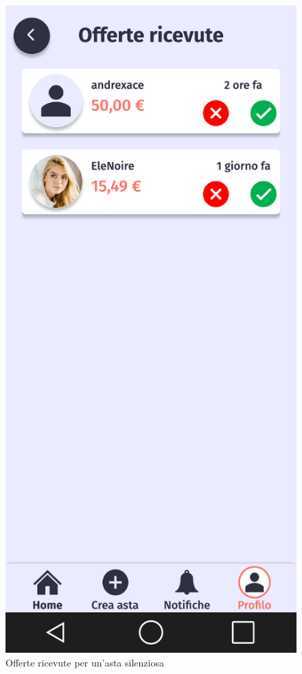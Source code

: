 \begin{figure}[!htb]
\begin{minipage}{0.32\textwidth}
            \includegraphics[width=.7\linewidth]{Immagini/Frames/Venditore/V13.pdf}
            \caption{Offerte ricevute per un'asta silenziosa}
        \end{minipage}\hfill
    \end{figure}

    \clearpage

